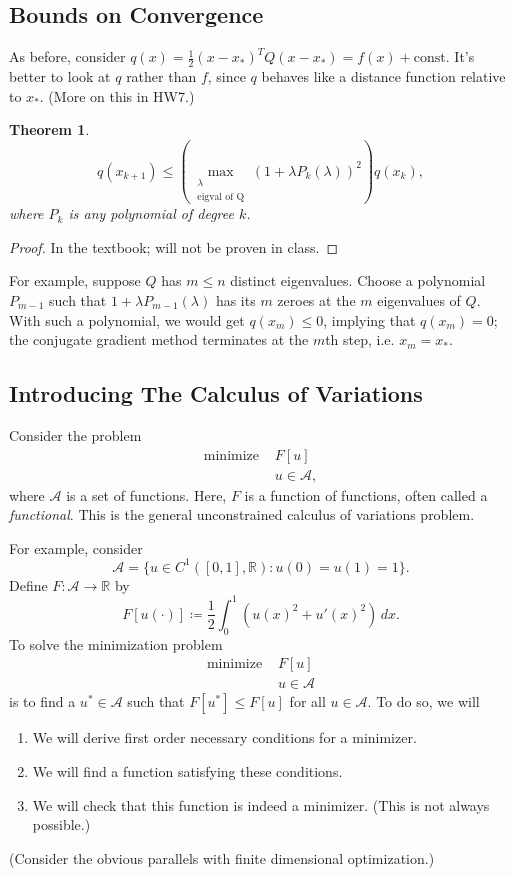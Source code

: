 \documentclass[11pt]{article}
\newcommand{\R}{\mathbb{R}}
\newtheorem{theorem}{Theorem}[subsection]
\begin{document}
\subsection{Bounds on Convergence}

As before, consider $q(x) = \frac{1}{2}(x-x_*)^TQ(x-x_*) = f(x) + \text{const}$. It's better to look at $q$ rather than $f$, since $q$ behaves like a distance function relative to $x_*$. (More on this in HW7.)

\begin{theorem}
\[
q(x_{k+1}) \leq \left( \max_{\substack{\lambda \\ \text{eigval of Q}}} (1 + \lambda P_k(\lambda))^2 \right) q(x_k),
\]
where $P_k$ is any polynomial of degree $k$.
\end{theorem}
\begin{proof}
In the textbook; will not be proven in class.
\end{proof}

For example, suppose $Q$ has $m \leq n$ distinct eigenvalues. Choose a polynomial $P_{m-1}$ such that $1 + \lambda P_{m-1}(\lambda)$ has its $m$ zeroes at the $m$ eigenvalues of $Q$. With such a polynomial, we would get $q(x_m) \leq 0$, implying that $q(x_m) = 0$; the conjugate gradient method terminates at the $m$th step, i.e. $x_m=x_*$.

\subsection{Introducing The Calculus of Variations}

Consider the problem
\begin{align*}
\text{minimize } &F[u] \\
&u \in \mathcal{A},
\end{align*}
where $\mathcal{A}$ is a set of functions. Here, $F$ is a function of functions, often called a \emph{functional}. This is the general unconstrained calculus of variations problem.

For example, consider
\[
\mathcal{A} = \{ u \in C^1([0, 1], \R) : u(0) = u(1) = 1  \}.
\]
Define $F : \mathcal{A} \to \R$ by
\[
F[u(\cdot)] \coloneqq \frac{1}{2} \int_0^1 (u(x)^2 + u'(x)^2) \, dx.
\]
To solve the minimization problem
\begin{align*}
\text{minimize } &F[u] \\
&u \in \mathcal{A}
\end{align*}
is to find a $u^* \in \mathcal{A}$ such that $F[u^*] \leq F[u]$ for all $u \in \mathcal{A}$. To do so, we will
\begin{enumerate}
\item
We will derive first order necessary conditions for a minimizer.
\item
We will find a function satisfying these conditions.
\item
We will check that this function is indeed a minimizer. (This is not always possible.)
\end{enumerate}
(Consider the obvious parallels with finite dimensional optimization.)
\end{document}
